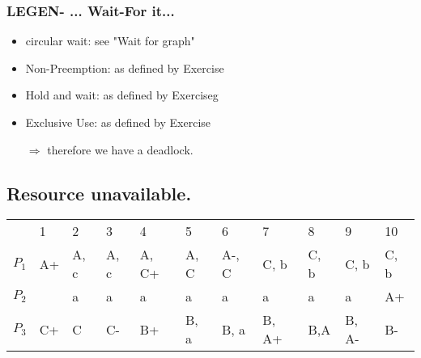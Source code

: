 \documentclass[a4paper, 11pt]{article}
\begin{document}
      \subsubsection{LEGEN- ... Wait-For it... }
      \begin{multicols}{3}
            \begin{itemize}
                  \item circular wait: see "Wait for graph"
                  \item Non-Preemption: as defined by Exercise
                  \item Hold and wait: as defined by Exerciseg
                  \item Exclusive Use: as defined by Exercise
                  \item[$\Rightarrow$] therefore we have a deadlock.
            \end{itemize}
      \end{multicols}
      \newpage

      \subsection{Resource unavailable.}
      \begin{table}[h!]
            \centering
            \begin{tabular}{|l||l|l|l|l|l|l|l|l|l|l|} 
                  \hline
                  \multicolumn{1}{|l|}{} & 1  & 2    & 3    & 4     & 5    & 6     & 7    & 8    & 9    & 10    \\ 
                  \hhline{|=:t:==========|}
                  $P_1$               & A+ & A, c & A, c & A, C+ & A, C & A-, C & C, b & C, b & C, b & C, b  \\ 
                  \hline
                  $P_2$               &    & a    & a    & a     & a    & a     & a   & a    & a & A+  \\ 
                  \hline
                  $P_3$               & C+ & C    & C-   & B+    & B, a & B, a  & B, A+ & B,A  & B, A- & B-   \\
                  \hline
            \end{tabular}
      \end{table}
\end{document}
